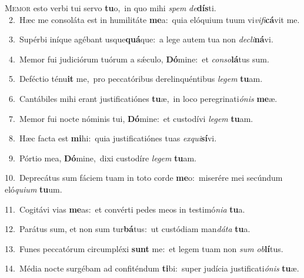 \lettrine{\initial\textcolor{\initialcolor}{M}}{emor} esto verbi tui servo \textbf{tu}\-o,~\star in quo mihi \textit{spem} \textit{de}\-\textbf{dís}ti.\\
{\numbfont\textcolor{\numbcolor}{~2.}}~Hæc me consoláta est in humilitáte \textbf{me}\-a:~\star quia elóquium tuum vi\-\textit{vi}\-\textit{fi}\textbf{cá}vit me.\par
{\numbfont\textcolor{\numbcolor}{~3.}}~Supérbi iníque agébant usque\-\textbf{quá}\-que:~\star a lege autem tua non \textit{de}\-\textit{cli}\textbf{ná}vi.\par
{\numbfont\textcolor{\numbcolor}{~4.}}~Memor fui judiciórum tuórum a sǽculo, \textbf{Dó}\-mine:~\star et \textit{con}\-\textit{so}\textbf{lá}tus sum.\par
{\numbfont\textcolor{\numbcolor}{~5.}}~Deféctio ténu\textbf{it} me,~\star pro peccatóribus derelinquéntibus \textit{le}\-\textit{gem} \textbf{tu}\-am.\par
{\numbfont\textcolor{\numbcolor}{~6.}}~Cantábiles mihi erant justificatiónes \textbf{tu}\-æ,~\star in loco peregrinati\-\textit{ó}\-\textit{nis} \textbf{me}\-æ.\par
{\numbfont\textcolor{\numbcolor}{~7.}}~Memor fui nocte nóminis tui, \textbf{Dó}\-mine:~\star et custodívi \textit{le}\-\textit{gem} \textbf{tu}\-am.\par
{\numbfont\textcolor{\numbcolor}{~8.}}~Hæc facta est \textbf{mi}\-hi:~\star quia justificatiónes tuas \textit{ex}\-\textit{qui}\textbf{sí}vi.\par
{\numbfont\textcolor{\numbcolor}{~9.}}~Pórtio mea, \textbf{Dó}\-mine,~\star dixi custodíre \textit{le}\-\textit{gem} \textbf{tu}\-am.\par
{\numbfont\textcolor{\numbcolor}{10.}}~Deprecátus sum fáciem tuam in toto corde \textbf{me}\-o:~\star miserére mei secúndum eló\-\textit{qui}\-\textit{um} \textbf{tu}\-um.\par
{\numbfont\textcolor{\numbcolor}{11.}}~Cogitávi vias \textbf{me}\-as:~\star et convérti pedes meos in testimó\-\textit{ni}\-\textit{a} \textbf{tu}\-a.\par
{\numbfont\textcolor{\numbcolor}{12.}}~Parátus sum, et non sum tur\-\textbf{bá}\-tus:~\star ut custódiam man\-\textit{dá}\-\textit{ta} \textbf{tu}\-a.\par
{\numbfont\textcolor{\numbcolor}{13.}}~Funes peccatórum circumpléxi \textbf{sunt} me:~\star et legem tuam non \textit{sum} \textit{ob}\-\textbf{lí}tus.\par
{\numbfont\textcolor{\numbcolor}{14.}}~Média nocte surgébam ad confiténdum \textbf{ti}\-bi:~\star super judícia justificati\-\textit{ó}\-\textit{nis} \textbf{tu}\-æ.\par
